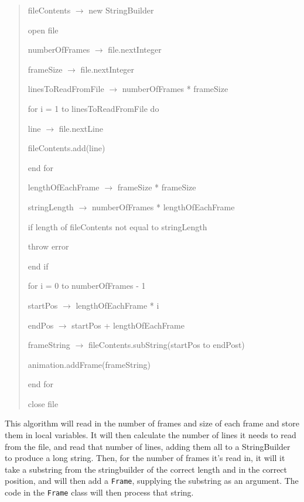 \documentclass[a4paper, 11pt]{article}
\begin{document}
\begin{quotation}
\begin{tt}

fileContents $\rightarrow$ new StringBuilder \par
open file \par
numberOfFrames $\rightarrow$ file.nextInteger \par
frameSize $\rightarrow$ file.nextInteger \par
linesToReadFromFile $\rightarrow$ numberOfFrames * frameSize \par
for i = 1 to linesToReadFromFile do \par
{\addtolength{\leftskip}{5mm} line $\rightarrow$ file.nextLine \par}
{\addtolength{\leftskip}{5mm} fileContents.add(line) \par}
end for \par
lengthOfEachFrame $\rightarrow$ frameSize * frameSize \par
stringLength $\rightarrow$ numberOfFrames * lengthOfEachFrame \par
if length of fileContents not equal to stringLength \par
{\addtolength{\leftskip}{5mm} throw error \par}
end if \par
for i = 0 to numberOfFrames - 1\par
{\addtolength{\leftskip}{5mm} startPos $\rightarrow$ lengthOfEachFrame * i  \par}
{\addtolength{\leftskip}{5mm} endPos $\rightarrow$ startPos + lengthOfEachFrame \par}
{\addtolength{\leftskip}{5mm} frameString $\rightarrow$ fileContents.subString(startPos to endPost)\par}
{\addtolength{\leftskip}{5mm} animation.addFrame(frameString) \par}
end for \par
close file \par

\end{tt}
\end{quotation}

This algorithm will read in the number of frames and size of each frame and store them in local variables. It will then calculate the number of lines it needs to read from the file, and read that number of lines, adding them all to a StringBuilder to produce a long string. Then, for the number of frames it's read in, it will it take a substring from the stringbuilder of the correct length and in the correct position, and will then add a \texttt{Frame}, supplying the substring as an argument. The code in the \texttt{Frame} class will then process that string.
\end{document}
